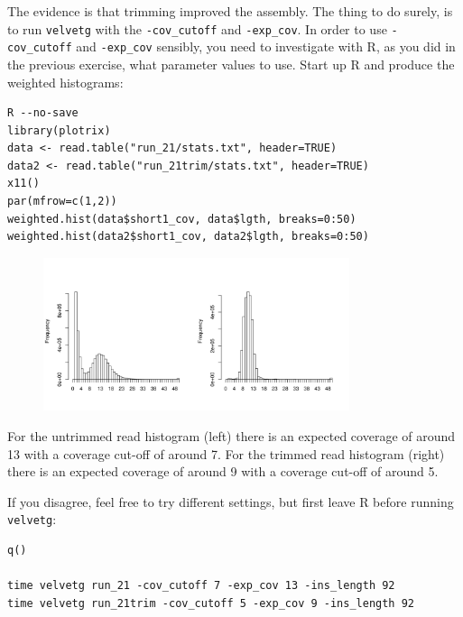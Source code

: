 \begin{steps}
The evidence is that trimming improved the assembly. The thing to do surely, is
to run \texttt{velvetg} with the \texttt{-cov\_cutoff} and \texttt{-exp\_cov}. In order
to use \texttt{-cov\_cutoff} and \texttt{-exp\_cov} sensibly, you need to
investigate with R, as you did in the previous exercise, what parameter values
to use. Start up R and produce the weighted histograms:
\begin{lstlisting}
R --no-save
library(plotrix) 
data <- read.table("run_21/stats.txt", header=TRUE) 
data2 <- read.table("run_21trim/stats.txt", header=TRUE) 
x11()
par(mfrow=c(1,2))
weighted.hist(data$short1_cov, data$lgth, breaks=0:50)
weighted.hist(data2$short1_cov, data2$lgth, breaks=0:50)
\end{lstlisting}

\begin{figure}[H]
\centering
\includegraphics[width=0.8\textwidth]{de_novo/velvet/velvet_Rplot002.png}
\label{fig:velvet_Rplot002}
\end{figure}

For the untrimmed read histogram (left) there is an expected coverage of around
13 with a coverage cut-off of around 7. For the trimmed read histogram (right)
there is an expected coverage of around 9 with a coverage cut-off of around 5.

If you disagree, feel free to try different settings, but first leave R before
running \texttt{velvetg}:
\begin{lstlisting}
q()

time velvetg run_21 -cov_cutoff 7 -exp_cov 13 -ins_length 92
time velvetg run_21trim -cov_cutoff 5 -exp_cov 9 -ins_length 92
\end{lstlisting}

\end{steps}

